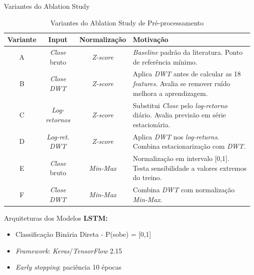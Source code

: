 \documentclass[10pt]{beamer}
\begin{document}
\begin{frame}{Variantes do Ablation Study}
\footnotesize
\setlength{\tabcolsep}{2pt}
\renewcommand{\arraystretch}{1.0}
\begin{table}
\centering
\caption{Variantes do Ablation Study de Pré-processamento}
\begin{tabular}{|c|c|c|p{}|}
\hline
\textbf{Variante} & \textbf{Input} & \textbf{Normalização} & \textbf{Motivação} \\
\hline
A & \textit{Close} bruto & \textit{Z-score} & \textit{Baseline} padrão da literatura. Ponto de referência mínimo. \\
\hline
B & \textit{Close} \textit{DWT} & \textit{Z-score} & Aplica \textit{DWT} antes de calcular as 18 \textit{features}. Avalia se remover ruído melhora a aprendizagem. \\
\hline
C & \textit{Log-retornos} & \textit{Z-score} & Substitui \textit{Close} pelo \textit{log-retorno} diário. Avalia previsão em série estacionária. \\
\hline
D & \textit{Log-ret.} \textit{DWT} & \textit{Z-score} & Aplica \textit{DWT} nos \textit{log-returns}. Combina estacionarização com \textit{DWT}. \\
\hline
E & \textit{Close} bruto & \textit{Min-Max} & Normalização em intervalo [0,1]. Testa sensibilidade a valores extremos do treino. \\
\hline
F & \textit{Close} \textit{DWT} & \textit{Min-Max} & Combina \textit{DWT} com normalização \textit{Min-Max}. \\
\hline
\end{tabular}
\end{table}
\end{frame}

\begin{frame}{Arquiteturas dos Modelos}
\textbf{LSTM:}
\begin{itemize}
    \item Classificação Binária Direta - P(sobe) = [0,1]
    \item \textit{Framework}: \textit{Keras}/\textit{TensorFlow} 2.15
    \item \textit{Early stopping}: paciência 10 épocas
\end{itemize}
\end{frame}
\end{document}
